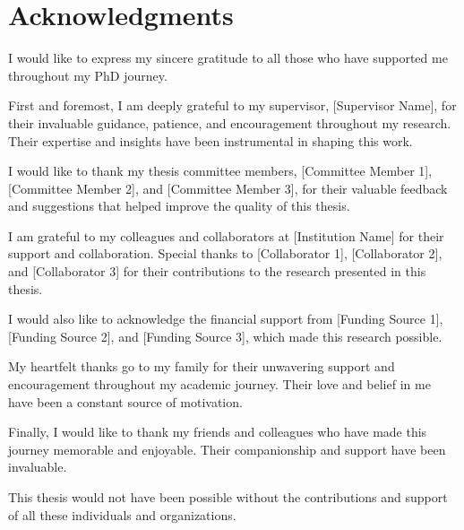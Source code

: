 \chapter*{Acknowledgments}

I would like to express my sincere gratitude to all those who have supported me throughout my PhD journey.

First and foremost, I am deeply grateful to my supervisor, [Supervisor Name], for their invaluable guidance, patience, and encouragement throughout my research. Their expertise and insights have been instrumental in shaping this work.

I would like to thank my thesis committee members, [Committee Member 1], [Committee Member 2], and [Committee Member 3], for their valuable feedback and suggestions that helped improve the quality of this thesis.

I am grateful to my colleagues and collaborators at [Institution Name] for their support and collaboration. Special thanks to [Collaborator 1], [Collaborator 2], and [Collaborator 3] for their contributions to the research presented in this thesis.

I would also like to acknowledge the financial support from [Funding Source 1], [Funding Source 2], and [Funding Source 3], which made this research possible.

My heartfelt thanks go to my family for their unwavering support and encouragement throughout my academic journey. Their love and belief in me have been a constant source of motivation.

Finally, I would like to thank my friends and colleagues who have made this journey memorable and enjoyable. Their companionship and support have been invaluable.

This thesis would not have been possible without the contributions and support of all these individuals and organizations.
